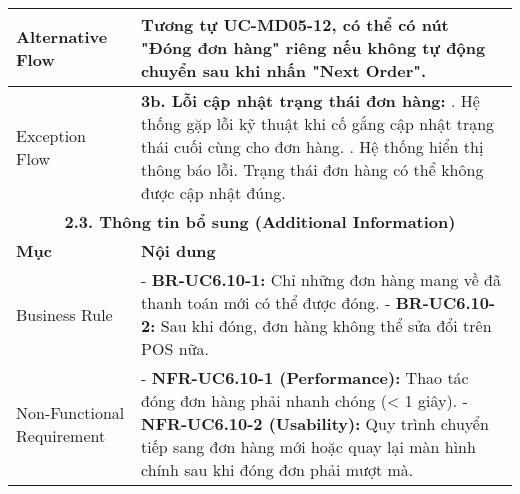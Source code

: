 \begin{longtable}{|m{4cm}|p{11cm}|}
\hline
Alternative Flow & Tương tự UC-MD05-12, có thể có nút "Đóng đơn hàng" riêng nếu không tự động chuyển sau khi nhấn "Next Order". \\
\hline
Exception Flow & \textbf{3b. Lỗi cập nhật trạng thái đơn hàng:} \newline    1. Hệ thống gặp lỗi kỹ thuật khi cố gắng cập nhật trạng thái cuối cùng cho đơn hàng. \newline    2. Hệ thống hiển thị thông báo lỗi. Trạng thái đơn hàng có thể không được cập nhật đúng. \\
\hline
\multicolumn{2}{|c|}{\textbf{2.3. Thông tin bổ sung (Additional Information)}} \\
\hline
\textbf{Mục} & \textbf{Nội dung} \\
\hline
Business Rule & - \textbf{BR-UC6.10-1:} Chỉ những đơn hàng mang về đã thanh toán mới có thể được đóng. \newline - \textbf{BR-UC6.10-2:} Sau khi đóng, đơn hàng không thể sửa đổi trên POS nữa. \\
\hline
Non-Functional Requirement & - \textbf{NFR-UC6.10-1 (Performance):} Thao tác đóng đơn hàng phải nhanh chóng (< 1 giây). \newline - \textbf{NFR-UC6.10-2 (Usability):} Quy trình chuyển tiếp sang đơn hàng mới hoặc quay lại màn hình chính sau khi đóng đơn phải mượt mà. \\
\hline
\end{longtable}

